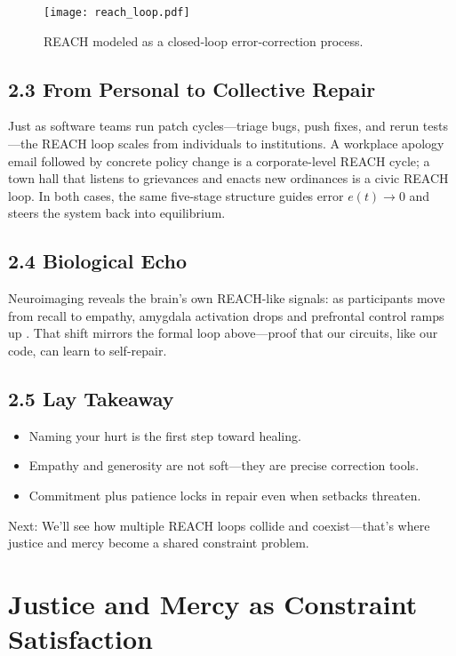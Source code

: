 \documentclass{book}       %
\begin{document}
\begin{figure}[h]
  \centering
  \texttt{[image: reach\_loop.pdf]}
  \caption{REACH modeled as a closed‐loop error‐correction process.}
\end{figure}

\section*{2.3  From Personal to Collective Repair}

Just as software teams run patch cycles—triage bugs, push fixes, and rerun tests—the REACH loop scales  
from individuals to institutions.  A workplace apology email followed by concrete policy change is a corporate-level REACH cycle;  
a town hall that listens to grievances and enacts new ordinances is a civic REACH loop.  
In both cases, the same five‐stage structure guides error $e(t)\to0$ and steers the system back into equilibrium.

\section*{2.4  Biological Echo}

Neuroimaging reveals the brain’s own REACH-like signals:  
as participants move from recall to empathy, amygdala activation drops and prefrontal control ramps up \cite{Worthington2006_REACH}.  
That shift mirrors the formal loop above—proof that our circuits, like our code, can learn to self-repair.

\section*{2.5  Lay Takeaway}

\begin{itemize}[noitemsep]
  \item Naming your hurt is the first step toward healing.  
  \item Empathy and generosity are not soft—they are precise correction tools.  
  \item Commitment plus patience locks in repair even when setbacks threaten.  
\end{itemize}

\bigskip
\noindent Next: We’ll see how multiple REACH loops collide and coexist—that’s where justice and mercy become a shared constraint problem.



\chapter{Justice and Mercy as Constraint Satisfaction}
\end{document}

